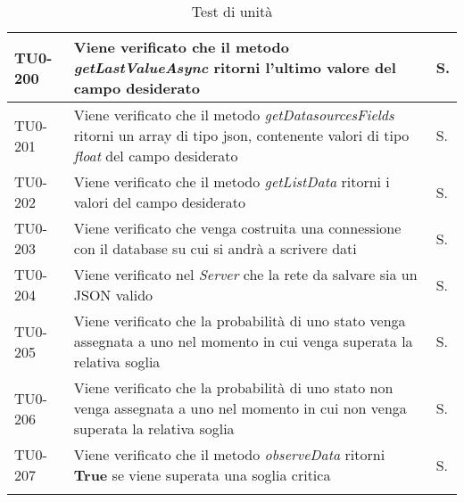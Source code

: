 \begin{longtable}{|C{.15\textwidth}|m{.66\textwidth}|C{.10\textwidth}|}
\hline
{}TU0-200 & Viene verificato che il metodo \textit{getLastValueAsync} ritorni l'ultimo valore del campo desiderato & S.\\
\hline
TU0-201 & Viene verificato che il metodo \textit{getDatasourcesFields} ritorni un array di tipo json, contenente valori di tipo \textit{float} del campo desiderato & S.\\
\hline
{}TU0-202 & Viene verificato che il metodo \textit{getListData} ritorni i valori del campo desiderato & S.\\
\hline
TU0-203 & Viene verificato che venga costruita una connessione con il database su cui si andrà a scrivere dati & S.\\
\hline
{}TU0-204 & Viene verificato nel \textit{Server} che la rete da salvare sia un JSON valido & S.\\
\hline
TU0-205 & Viene verificato che la probabilità di uno stato venga assegnata a uno nel momento in cui venga superata la relativa soglia & S.\\
\hline
{}TU0-206 & Viene verificato che la probabilità di uno stato non venga assegnata a uno nel momento in cui non venga superata la relativa soglia & S.\\
\hline
TU0-207 & Viene verificato che il metodo \textit{observeData} ritorni \textbf{True} se viene superata una soglia critica & S.\\
\hline
\caption{Test di unità}


\label{testunita}
\end{longtable}



